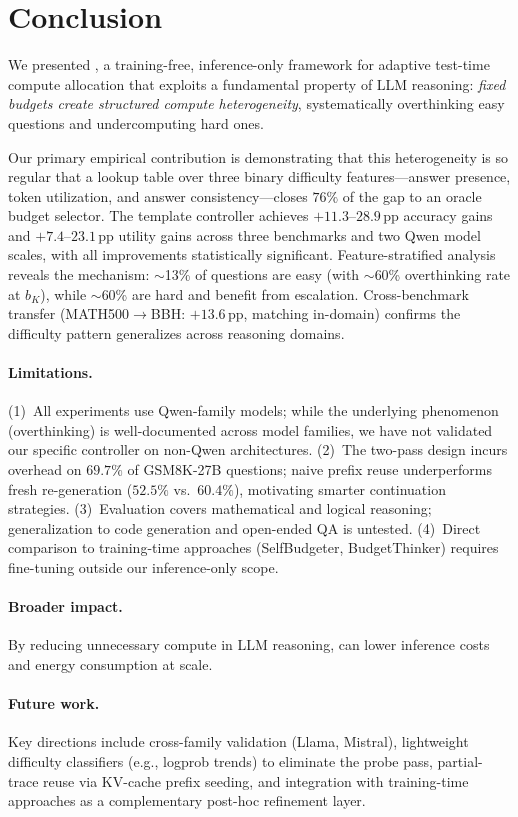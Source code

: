 \section{Conclusion}
\label{sec:conclusion}

We presented \adathink{}, a training-free, inference-only framework for adaptive test-time compute allocation that exploits a fundamental property of LLM reasoning: \emph{fixed budgets create structured compute heterogeneity}, systematically overthinking easy questions and undercomputing hard ones.

Our primary empirical contribution is demonstrating that this heterogeneity is so regular that a lookup table over three binary difficulty features---answer presence, token utilization, and answer consistency---closes $76\%$ of the gap to an oracle budget selector.
The template controller achieves $+11.3$--$28.9$\,pp accuracy gains and $+7.4$--$23.1$\,pp utility gains across three benchmarks and two Qwen model scales, with all improvements statistically significant.
Feature-stratified analysis reveals the mechanism: $\sim$13\% of questions are easy (with $\sim$60\% overthinking rate at $b_K$), while $\sim$60\% are hard and benefit from escalation.
Cross-benchmark transfer (MATH500$\to$BBH: $+13.6$\,pp, matching in-domain) confirms the difficulty pattern generalizes across reasoning domains.

\paragraph{Limitations.}
(1)~All experiments use Qwen-family models; while the underlying phenomenon (overthinking) is well-documented across model families, we have not validated our specific controller on non-Qwen architectures.
(2)~The two-pass design incurs overhead on $69.7\%$ of GSM8K-27B questions; naive prefix reuse underperforms fresh re-generation ($52.5\%$ vs.\ $60.4\%$), motivating smarter continuation strategies.
(3)~Evaluation covers mathematical and logical reasoning; generalization to code generation and open-ended QA is untested.
(4)~Direct comparison to training-time approaches (SelfBudgeter, BudgetThinker) requires fine-tuning outside our inference-only scope.

\paragraph{Broader impact.}
By reducing unnecessary compute in LLM reasoning, \adathink{} can lower inference costs and energy consumption at scale.

\paragraph{Future work.}
Key directions include cross-family validation (Llama, Mistral), lightweight difficulty classifiers (e.g., logprob trends) to eliminate the probe pass, partial-trace reuse via KV-cache prefix seeding, and integration with training-time approaches as a complementary post-hoc refinement layer.
